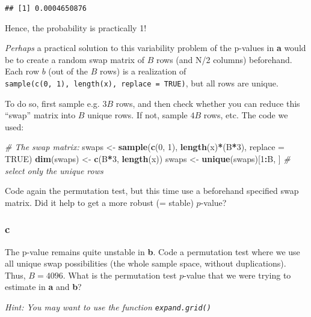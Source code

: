 \documentclass[]{article}
\newenvironment{Shaded}{\begin{snugshade}}{\end{snugshade}}
\newcommand{\CommentTok}[1]{\textcolor[rgb]{0.56,0.35,0.01}{\textit{#1}}}
\newcommand{\DataTypeTok}[1]{\textcolor[rgb]{0.13,0.29,0.53}{#1}}
\newcommand{\DecValTok}[1]{\textcolor[rgb]{0.00,0.00,0.81}{#1}}
\newcommand{\KeywordTok}[1]{\textcolor[rgb]{0.13,0.29,0.53}{\textbf{#1}}}
\newcommand{\NormalTok}[1]{#1}
\newcommand{\OperatorTok}[1]{\textcolor[rgb]{0.81,0.36,0.00}{\textbf{#1}}}
\newcommand{\OtherTok}[1]{\textcolor[rgb]{0.56,0.35,0.01}{#1}}
\newcommand{\StringTok}[1]{\textcolor[rgb]{0.31,0.60,0.02}{#1}}
\begin{document}
\begin{verbatim}
## [1] 0.0004650876
\end{verbatim}

Hence, the probability is practically 1!

\emph{Perhaps} a practical solution to this variability problem of the
p-values in \textbf{a} would be to create a random swap matrix of \(B\)
rows (and N/2 columns) beforehand. Each row \(b\) (out of the \(B\)
rows) is a realization of
\texttt{sample(c(0,\ 1),\ length(x),\ replace\ =\ TRUE)}, but all rows
are unique.

To do so, first sample e.g. \(3B\) rows, and then check whether you can
reduce this ``swap'' matrix into \(B\) unique rows. If not, sample
\(4B\) rows, etc. The code we used:

\begin{Shaded}
\begin{Highlighting}[]
\CommentTok{# The swap matrix:}
\NormalTok{swaps <-}\StringTok{ }\KeywordTok{sample}\NormalTok{(}\KeywordTok{c}\NormalTok{(}\DecValTok{0}\NormalTok{, }\DecValTok{1}\NormalTok{), }\KeywordTok{length}\NormalTok{(x)}\OperatorTok{*}\NormalTok{(B}\OperatorTok{*}\DecValTok{3}\NormalTok{), }\DataTypeTok{replace =} \OtherTok{TRUE}\NormalTok{)}
\KeywordTok{dim}\NormalTok{(swaps) <-}\StringTok{ }\KeywordTok{c}\NormalTok{(B}\OperatorTok{*}\DecValTok{3}\NormalTok{, }\KeywordTok{length}\NormalTok{(x))}
\NormalTok{swaps <-}\StringTok{ }\KeywordTok{unique}\NormalTok{(swaps)[}\DecValTok{1}\OperatorTok{:}\NormalTok{B, ] }\CommentTok{# select only the unique rows}
\end{Highlighting}
\end{Shaded}

Code again the permutation test, but this time use a beforehand
specified swap matrix. Did it help to get a more robust (= stable)
\(p\)-value?

\hypertarget{c-1}{%
\subsubsection{c}\label{c-1}}

The p-value remains quite unstable in \textbf{b}. Code a permutation
test where we use all unique swap possibilities (the whole sample space,
without duplications). Thus, \(B = 4096\). What is the permutation test
\(p\)-value that we were trying to estimate in \textbf{a} and
\textbf{b}?

\emph{Hint: You may want to use the function \texttt{expand.grid()}}
\end{document}
